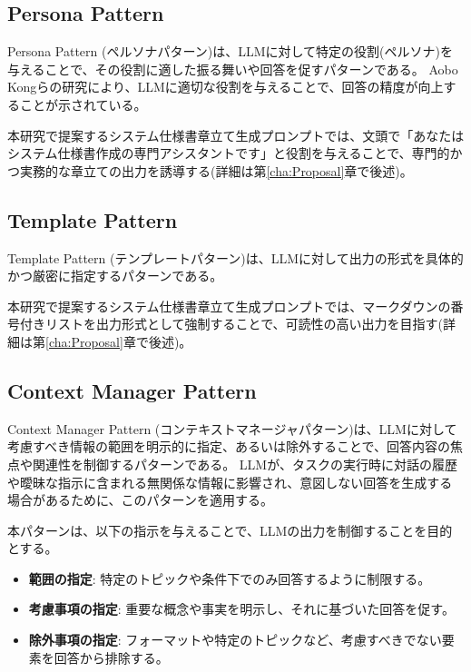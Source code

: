 \subsection{Persona Pattern}
\label{subsec:persona_pattern}

Persona Pattern (ペルソナパターン)は、LLMに対して特定の役割(ペルソナ)を与えることで、その役割に適した振る舞いや回答を促すパターンである\cite{prompt-patterns}。
Aobo Kongらの研究により、LLMに適切な役割を与えることで、回答の精度が向上することが示されている\cite{role_assignment}。

本研究で提案するシステム仕様書章立て生成プロンプトでは、文頭で「あなたはシステム仕様書作成の専門アシスタントです」と役割を与えることで、専門的かつ実務的な章立ての出力を誘導する(詳細は第\ref{cha:Proposal}章で後述)。

\subsection{Template Pattern}
\label{subsec:template_pattern}

Template Pattern (テンプレートパターン)は、LLMに対して出力の形式を具体的かつ厳密に指定するパターンである\cite{prompt-patterns}。

本研究で提案するシステム仕様書章立て生成プロンプトでは、マークダウンの番号付きリストを出力形式として強制することで、可読性の高い出力を目指す(詳細は第\ref{cha:Proposal}章で後述)。

\subsection{Context Manager Pattern}
\label{subsec:context_manager_pattern}

Context Manager Pattern (コンテキストマネージャパターン)は、LLMに対して考慮すべき情報の範囲を明示的に指定、あるいは除外することで、回答内容の焦点や関連性を制御するパターンである\cite{prompt-patterns}。
LLMが、タスクの実行時に対話の履歴や曖昧な指示に含まれる無関係な情報に影響され、意図しない回答を生成する場合があるために、このパターンを適用する。

本パターンは、以下の指示を与えることで、LLMの出力を制御することを目的とする。

\begin{itemize}
    \item \textbf{範囲の指定}: 特定のトピックや条件下でのみ回答するように制限する。
    \item \textbf{考慮事項の指定}: 重要な概念や事実を明示し、それに基づいた回答を促す。
    \item \textbf{除外事項の指定}: フォーマットや特定のトピックなど、考慮すべきでない要素を回答から排除する。
\end{itemize}


